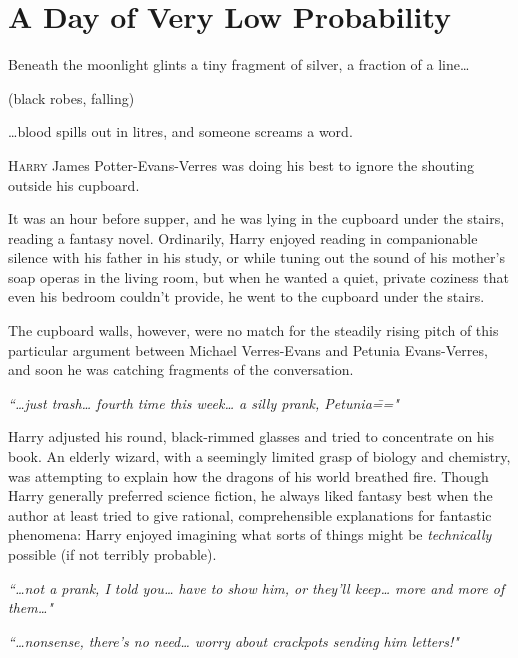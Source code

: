 \chapter{A Day of Very Low Probability}

\begin{chapterOpeningQuote}
\noindent
Beneath the moonlight glints a tiny fragment of silver, a fraction of a line{\ldots}

\vspace{2ex}
(black robes, falling)

\vspace{2ex}
{\ldots}blood spills out in litres, and someone screams a word.
\end{chapterOpeningQuote}

\lettrine{H}{arry} James Potter-Evans-Verres was doing his best to ignore the shouting outside his cupboard.

It was an hour before supper, and he was lying in the cupboard under the stairs, reading a fantasy novel. Ordinarily, Harry enjoyed reading in companionable silence with his father in his study, or while tuning out the sound of his mother's soap operas in the living room, but when he wanted a quiet, private coziness that even his bedroom couldn't provide, he went to the cupboard under the stairs.

The cupboard walls, however, were no match for the steadily rising pitch of this particular argument between Michael Verres-Evans and Petunia Evans-Verres, and soon he was catching fragments of the conversation.

\emph{``{\ldots}just trash{\ldots} fourth time this week{\ldots} a silly prank, Petunia\==="}

Harry adjusted his round, black-rimmed glasses and tried to concentrate on his book. An elderly wizard, with a seemingly limited grasp of biology and chemistry, was attempting to explain how the dragons of his world breathed fire. Though Harry generally preferred science fiction, he always liked fantasy best when the author at least tried to give rational, comprehensible explanations for fantastic phenomena: Harry enjoyed imagining what sorts of things might be \emph{technically} possible (if not terribly probable).

\emph{``{\ldots}not a prank, I told you{\ldots} have to show him, or they'll keep{\ldots} more and more of them{\ldots}"}

\emph{``{\ldots}nonsense, there's no need{\ldots} worry about crackpots sending him letters!"}

